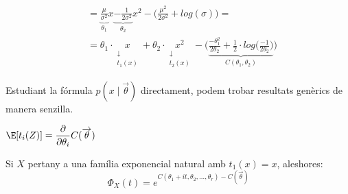 \begin{example}
\begin{enumerate}
\[\begin{split}
          & = \underbrace{\frac{\mu}{\sigma^{2}}}_{\theta_{1}}x \underbrace{-\frac{1}{2\sigma^{2}}}_{\theta_{2}}x^{2} - \Big(\frac{\mu^{2}}{2\sigma^{2}}+log(\sigma)\Big)= \\
          &= \theta_{1}\cdot\underset{\substack{\downarrow \\ t_{1}(x)}}{x} + \theta_{2}\cdot\underset{\substack{\downarrow \\ t_{2}(x)}}{x^{2}} - \bigg(\underbrace{\frac{-\theta_{1}^{2}}{2\theta_{2}}+\frac{1}{2}\cdot log\Big(\frac{-1}{2\theta_{2}}\Big)}_{C(\theta_{1},\theta_{2})}\bigg)
      \end{split}
      \]
  \end{enumerate}
\end{example}

\newpage
Estudiant la fórmula $p(x\mid \overrightarrow{\theta})$ directament, podem trobar resultats genèrics de manera senzilla.

\begin{prop}
  $\E[t_{i}(Z)] = \dfrac{\partial}{\partial \theta_{i}}C(\overrightarrow{\theta})$
\end{prop}

\begin{prop}
  Si $X$ pertany a una família exponencial natural amb $t_{1}(x) = x$, aleshores:
  \[
    \Phi_{X}(t) = e^{C(\theta_{1}+it, \theta_{2},\ldots,\theta_{r})-C(\overrightarrow{\theta})}
  \]
\end{prop}
